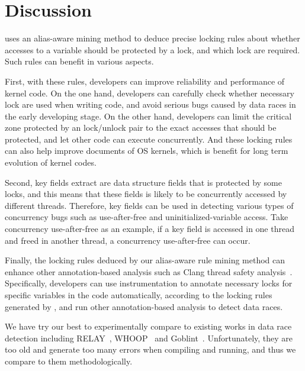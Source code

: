 \section{Discussion}
\label{sec_discussion}

 \sys uses an alias-aware mining method to 
deduce precise locking rules about whether accesses to a variable should be 
protected by a lock, and which lock are required. Such rules can benefit in 
various aspects. 

First, with these rules, developers can improve reliability 
and performance of kernel code. On the one hand, developers can carefully check 
whether necessary lock are used when writing code, and avoid serious bugs 
caused by data races in the early developing stage. On the other hand, 
developers can limit the critical zone protected by an lock/unlock pair to the 
exact accesses that should be protected, and let other code can execute 
concurrently. And these locking rules can also help improve documents of OS 
kernels, which is benefit for long term evolution of kernel codes.

Second, key fields extract \sys are data structure fields that is protected by 
some locks, and this means that these fields is likely to be concurrently 
accessed by different threads. Therefore, key fields can be used in detecting 
various types of concurrency bugs such as use-after-free and 
uninitialized-variable access. Take concurrency use-after-free as an example, 
if a key field is accessed in one thread and freed in another thread, a 
concurrency use-after-free can occur.

Finally, the locking rules deduced by our alias-aware rule mining method can 
enhance other annotation-based analysis such as Clang thread safety 
analysis~\cite{ClangThreadSafety}. Specifically, developers can use 
instrumentation to annotate necessary locks for specific variables in the code 
automatically, according to the locking rules generated by \sys, and run other 
annotation-based analysis to detect data races.

 We have try our best to experimentally 
compare \sys to existing works in data race detection including 
RELAY~\cite{Voung:FSE07}, WHOOP~\cite{Deligiannis:ASE15} and 
Goblint~\cite{Vojdani:ASE16}. Unfortunately, they are too old and generate too 
many errors when compiling and running, and thus we compare \sys to them 
methodologically.



